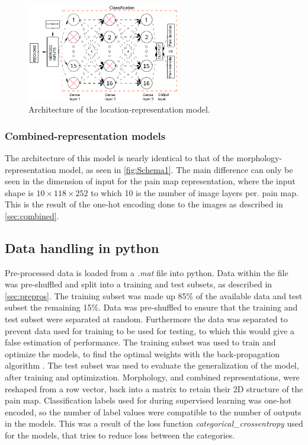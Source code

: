 \begin{figure} [H]
\centering
\includegraphics[width=0.6\textwidth]{figures/Simpleschema}
\caption{Architecture of the location-representation model.}
\label{fig:Simpleschema} 
\end{figure}

\subsubsection{Combined-representation models}
The architecture of this model is nearly identical to that of the morphology-representation model, as seen in \autoref{fig:Schema1}. 
The main difference can only be seen in the dimension of input for the pain map representation, where the input shape is $10 \times 118 \times 252$ to which 10 is the number of image layers per. pain map. This is the result of the one-hot encoding done to the images as described in \ref{sec:combined}. 


\subsection{Data handling in python}
Pre-processed data is loaded from a \textit{.mat} file into python.
Data within the file was pre-shuffled and split into a training and test subsets, as described in \autoref{sec:prepros}. The training subset was made up 85\% of the available data and test subset the remaining 15\%. Data was pre-shuffled to ensure that the training and test subset were separated at random. Furthermore the data was separated to prevent data used for training to be used for testing, to which this would give a false estimation of performance.  
The training subset was used to train and optimize the models, to find the optimal weights with the back-propagation algorithm \citep{Bengio2012}. 
The test subset was used to evaluate the generalization of the model, after training and optimization.
Morphology, and combined representations, were reshaped from a row vector, back into a matrix to retain their 2D structure of the pain map.
Classification labels used for during supervised learning was one-hot encoded, so the number of label values were compatible to the number of outputs in the models. This was a result of the loss function \textit{categorical\_crossentropy} used for the models, that tries to reduce loss between the categories.    
\newpage

